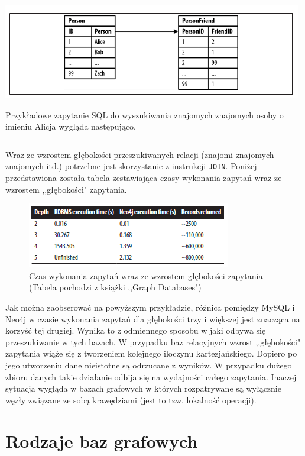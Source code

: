 \documentclass[brudnopis]{xmgr}
\begin{document}
\includegraphics[scale=0.75]{images/relational-schema-friends.png}

Przykładowe zapytanie SQL do wyszukiwania znajomych znajomych osoby o imieniu Alicja wygląda następująco.

\inputminted{sql}{listings/sql/relational-schema-friends-fof-query.sql}

Wraz ze wzrostem głębokości przeszukiwanych relacji (znajomi znajomych znajomych itd.) potrzebne jest skorzystanie z instrukcji \texttt{JOIN}. Poniżej przedstawiona została tabela zestawiająca czasy wykonania zapytań wraz ze wzrostem ,,głębokości" zapytania.

\begin{figure}[H]
	\includegraphics[scale=0.75]{images/relational-schema-friends-results.png}
	\caption{Czas wykonania zapytań wraz ze wzrostem głębokości zapytania (Tabela pochodzi z książki ,,Graph Databases")}
	\label{fig:mysqlvsneo4j_results}
\end{figure}

Jak można zaobserować na powyższym przykładzie, różnica pomiędzy MySQL i Neo4j w czasie wykonania zapytań dla głębokości trzy i większej jest znacząca na korzyść tej drugiej. Wynika to z odmiennego sposobu w jaki odbywa się przeszukiwanie w tych bazach. W przypadku baz relacyjnych wzrost ,,głębokości" zapytania wiąże się z tworzeniem kolejnego iloczynu kartezjańskiego. Dopiero po jego utworzeniu dane nieistotne są odrzucane z wyników. W przypadku dużego zbioru danych takie działanie odbija się na wydajności całego zapytania. Inaczej sytuacja wygląda w bazach grafowych w których rozpatrywane są wyłącznie węzły związane ze sobą krawędziami (jest to tzw. lokalność operacji).

\section{Rodzaje baz grafowych}
\end{document}
